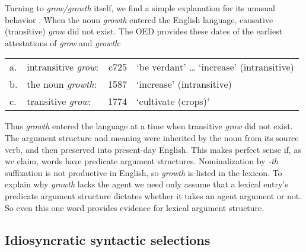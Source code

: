 \begin{exe}
\begin{xlist}[iv.]
\begin{exe}
\begin{xlist}[iv.]
Turning to \emph{grow/growth} itself, we find a simple explanation for its unusual behavior \citep{Wechsler2008a}.  When the noun \emph{growth} entered the English language,  causative (transitive)  \emph{grow} did not exist.  The OED provides these dates of the earliest attestations of \emph{grow} and \emph{growth}:	

\ea
\label{oed}
\begin{tabular}[t]{@{}l@{~}lrl@{}} 
a. & intransitive \emph{grow}: &  c725	& `be verdant' \ldots{} `increase' (intransitive)\\
b. & the noun \emph{growth}:   &  1587	& `increase' (intransitive)\\
c. & transitive \emph{grow}:   &  1774	& `cultivate (crops)'\\
\end{tabular}
\z

\noindent
Thus \emph{growth} entered the language at a time when transitive \emph{grow} did not exist. The argument structure and meaning were inherited by the noun from its source verb, and then preserved into present-day English.  This makes perfect sense if, as we claim, words have predicate argument structures.  Nominalization by \emph{-th} suffixation is not productive in English, so \emph{growth} is listed in the lexicon.  To explain why \emph{growth} lacks the agent we need only assume that a lexical entry's predicate argument structure dictates whether it takes an agent argument or not.   So even this one word provides evidence for lexical argument structure.  




\subsection{Idiosyncratic syntactic selections}
\label{sec-idiosyncratic-case-and-PP}



\end{xlist}
\end{exe}
\end{xlist}
\end{exe}
